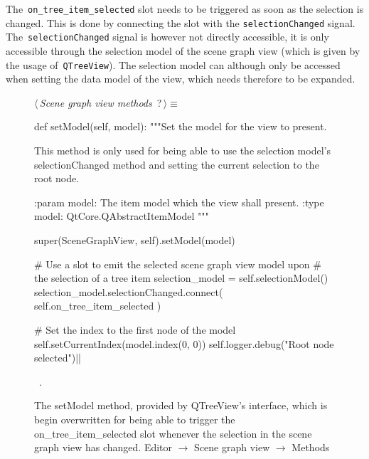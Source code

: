 \documentclass[%
    a4paper,    %
    justified,  %
    nobib,      %
    openany     %
]{tufte-book}
\begin{document}
The~\verb=on_tree_item_selected= slot needs to be triggered as soon as the
selection is changed. This is done by connecting the slot with the
\verb=selectionChanged= signal. The~\verb=selectionChanged= signal is however
not directly accessible, it is only accessible through the selection model of
the scene graph view (which is given by the usage of~\verb=QTreeView=). The
selection model can although only be accessed when setting the data model of the
view, which needs therefore to be expanded.

\begin{figure}
\begin{flushleft} \small
\begin{minipage}{\linewidth}\label{scrap44}\raggedright\small
{} $\langle\,${\itshape Scene graph view methods}\nobreak\ {\footnotesize {?}}$\,\rangle\equiv$
\vspace{-1ex}
\begin{pythoncode}
def setModel(self, model):
    """Set the model for the view to present.

    This method is only used for being able to use the selection
    model's selectionChanged method and setting the current
    selection to the root node.

    :param model: The item model which the view shall present.
    :type  model: QtCore.QAbstractItemModel
    """

    super(SceneGraphView, self).setModel(model)

    # Use a slot to emit the selected scene graph view model upon
    # the selection of a tree item
    selection_model = self.selectionModel()
    selection_model.selectionChanged.connect(
        self.on_tree_item_selected
    )

    # Set the index to the first node of the model
    self.setCurrentIndex(model.index(0, 0))
    self.logger.debug("Root node selected")|\NWsep|
\end{pythoncode}
\vspace{1.5ex}
\footnotesize
\begin{list}{}{\setlength{\itemsep}{-\parsep}\setlength{\itemindent}{-\leftmargin}}
\item \NWtxtMacroRefIn\ .

\item{}
\end{list}
\end{minipage}\vspace{4ex}
\end{flushleft}
\caption{The setModel method, provided by QTreeView's interface, which is begin
  overwritten for being able to trigger the on\_tree\_item\_selected slot
  whenever the selection in the scene graph view has changed.
  \newline{}\newline{}Editor $\rightarrow$ Scene graph view
  $\rightarrow$ Methods}
\label{editor:lst:scene-graph-view:methods:set-model}
\end{figure}
\end{document}
